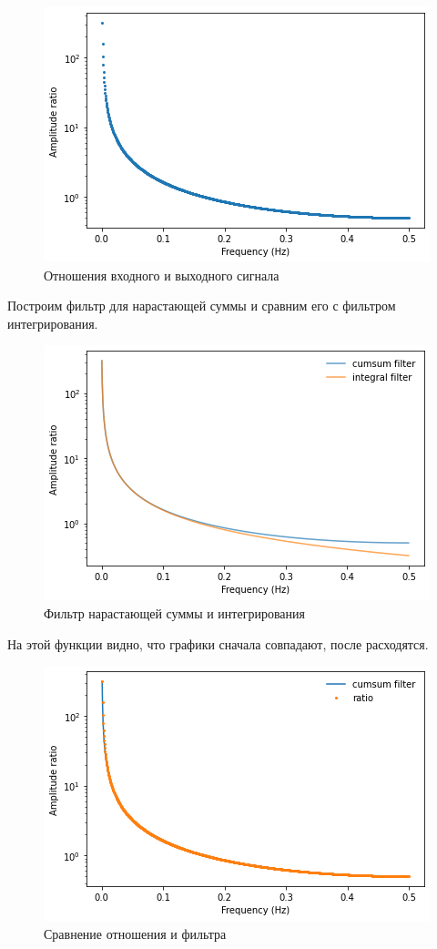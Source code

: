 \documentclass[a4paper, 14pt]{extarticle}
\begin{document}
    \begin{figure}[H]
        \centering
        \includegraphics[width=0.8\linewidth]{in_out_ratio}
        \caption{Отношения входного и выходного сигнала}
        \label{fig:in_out_ratio}
    \end{figure}

    Построим фильтр для нарастающей суммы и сравним его с фильтром интегрирования.

    \begin{figure}[H]
        \centering
        \includegraphics[width=0.8\linewidth]{cumsum_integr_diff}
        \caption{Фильтр нарастающей суммы и интегрирования}
        \label{fig:cumsum_integr_diff}
    \end{figure}

    На этой функции видно, что графики сначала совпадают, после расходятся.

    \begin{figure}[H]
        \centering
        \includegraphics[width=0.8\linewidth]{ratio_filter_diff}
        \caption{Сравнение отношения и фильтра}
        \label{fig:ratio_filter_diff}
    \end{figure}
\end{document}

